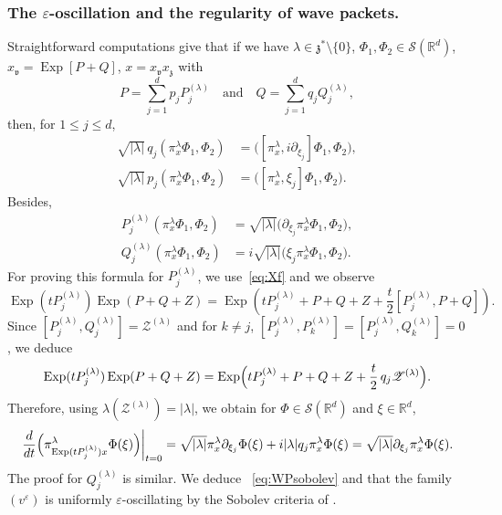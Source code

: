 \documentclass[JEP,XML,SOM,Unicode,published]{cedram}
\let\mathcal\mathscr
\DeclareMathOperator{\Exp}{Exp}
\theoremstyle{plain}
\theoremstyle{definition}
\let\eps\varepsilon
\def\R{{\mathbb R}}
\begin{document}
\subsubsection{The $\eps$-oscillation and the regularity of wave packets.}
Straightforward computations give that if we have
$\lambda\in {\mathfrak z}^*\setminus \{0\}$, $\Phi_1,\Phi_2\in \mathcal S(\R^d)$,
$x_{\mathfrak v} = \Exp [P+Q]$, $x=x_{\mathfrak v}x_{\mathfrak z}$ with
\[
P=\sum_{j=1}^{d} p_j P_j^{(\lambda)}\quad \text{and} \quad Q=\sum_{j=1}^{d} q_j Q_j^{(\lambda)},
\]
then, for $1\leq j\leq d$,
\begin{equation}\label{est:growth}
\begin{aligned}
\sqrt{|\lambda|} \,q_j \left(\pi^{\lambda}_{x} \Phi_1,\Phi_2\right)&= \bigl([ \pi^{ \lambda}_{x}, i\partial_{\xi_j}]\Phi_1,\Phi_2\bigr),\\
\sqrt{|\lambda|} \, p_j \left(\pi^{ \lambda}_{x} \Phi_1,\Phi_2\right)&= \bigl([\pi^{ \lambda}_{x},\xi_j]\Phi_1,\Phi_2\bigr).
\end{aligned}
\end{equation}
Besides,
\begin{equation}\label{eq:PQWP}
\begin{aligned}
P_j^{(\lambda)} \left(\pi^{\lambda}_{x} \Phi_1,\Phi_2\right)& = \sqrt{|\lambda|} \bigl(\partial_{\xi_j} \pi^{\lambda}_{x}\Phi_1,\Phi_2\bigr),\\
Q_j^{(\lambda)} \left(\pi^{\lambda}_{x} \Phi_1,\Phi_2\right) &= i\sqrt{|\lambda|} \bigl(
\xi_j \pi^\lambda_{x} \Phi_1,\Phi_2\bigr).
\end{aligned}
\end{equation}
For proving this formula for $P_j^{(\lambda)}$, we use~\eqref{eq:Xf} and we observe
\[
\Exp (tP_j^{(\lambda)}) \Exp (P+Q+Z) = \Exp (tP_j^{(\lambda)}+P+Q+Z +\frac t2 [P_j^{(\lambda)},P+Q]).
\]
Since $[P_j^{(\lambda)}, Q_j^{(\lambda)}]= \mathcal Z^{(\lambda)}$ and for $k\not=j$,
$[P_j^{(\lambda)}, P_k^{(\lambda)}]=[P_j^{(\lambda)},Q_k^{(\lambda)}]=0$,
we deduce
\[
\Exp (tP_j^{(\lambda)}) \Exp (P+Q+Z) = \Exp \Bigl(tP_j^{(\lambda)}+P+Q+Z +\frac t2\, q_j {\mathcal Z}^{(\lambda)} \Bigr).
\]
Therefore, using $\lambda(\mathcal Z^{(\lambda)})= |\lambda|$, we obtain for $\Phi\in\mathcal S(\R^d)$ and $\xi\in\R^d$,
\[
\left.\frac d {dt} \Bigl(\pi^\lambda_{ \Exp (tP_j^{(\lambda)}) x} \Phi(\xi) \Bigr)\right|_{t=0} =
\sqrt{|\lambda|} \pi^\lambda_{ x} \partial_{\xi_j} \Phi(\xi)
+i |\lambda| q_j \pi^\lambda_{ x} \Phi(\xi)=\sqrt{|\lambda|} \partial_{\xi_j} \pi^\lambda_{ x}\Phi(\xi).
\]
The proof for $Q_j^{(\lambda)}$ is similar.
We deduce
~\eqref{eq:WPsobolev} and that the family $(v^\eps)$ is uniformly $\eps$-oscillating by the Sobolev criteria of \cite[Prop.\,4.6]{FF1}.
\end{document}
